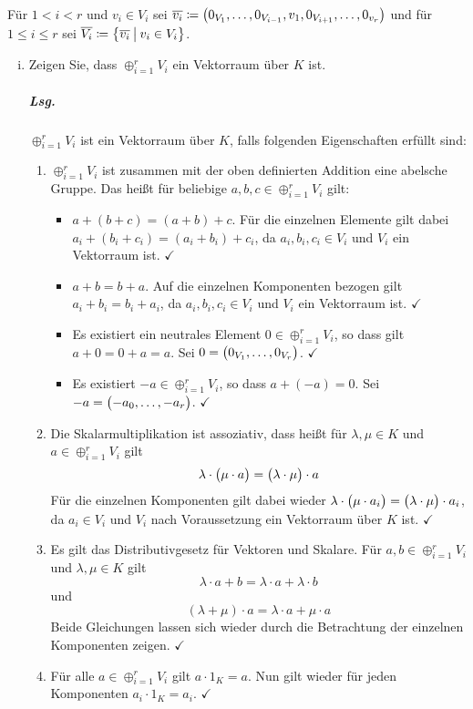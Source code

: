 \documentclass{scrreprt}
\begin{document}
\noindent
Für $1 < i < r$ und $v_i \in V_i$ sei $\overline{v_i} \coloneqq \qty\big(
  0_{V_1}, \ldots, 0_{V_{i - 1}}, v_1, 0_{V_{i + 1}}, \ldots, 0_{v_r}
)$ und für $1 \leq i \leq r$ sei $\overline{V_i} \coloneqq \qty\big{
  \overline{v_i} \:{\big |}\: v_i \in V_i
}$.
\newpage
\begin{enumerate}[(i)]
\item Zeigen Sie, dass $\oplus_{i = 1}^r V_i$ ein Vektorraum über $K$ ist.

  \subparagraph{Lsg.} $\oplus_{i = 1}^r V_i$ ist ein Vektorraum über $K$, falls
  folgenden Eigenschaften erfüllt sind:
  \begin{enumerate}[(1)]
  \item $\oplus_{i = 1}^r V_i$ ist zusammen mit der oben definierten Addition
    eine abelsche Gruppe.
    Das heißt für beliebige $a, b, c \in \oplus_{i = 1}^r V_i$ gilt:
    \begin{itemize}
    \item $a + (b + c) = (a + b) + c$.
      Für die einzelnen Elemente gilt dabei
      $a_i + (b_i + c_i) = (a_i + b_i) + c_i$, da $a_i, b_i, c_i \in V_i$
      und $V_i$ ein Vektorraum ist. $\checkmark$
    \item $a + b = b + a$.
      Auf die einzelnen Komponenten bezogen gilt $a_i + b_i = b_i + a_i$,
      da $a_i, b_i, c_i \in V_i$ und $V_i$ ein Vektorraum ist. $\checkmark$
    \item Es existiert ein neutrales Element $0 \in \oplus_{i = 1}^r V_i$,
      so dass gilt $a + 0 = 0 + a = a$.
      Sei $0 = \qty\big(0_{V_1}, \ldots, 0_{V_r})$.
      $\checkmark$
    \item Es existiert $-a \in \oplus_{i = 1}^r V_i$, so dass $a + (-a) = 0$.
      Sei $-a = \qty\big(-a_0, \ldots, -a_r)$.
      $\checkmark$
    \end{itemize}
  \item Die Skalarmultiplikation ist assoziativ, dass heißt für
    $\lambda, \mu \in K$ und $a \in \oplus_{i = 1}^r V_i$ gilt
    \[
      \lambda \cdot \qty\big(\mu \cdot a)
      = \qty\big(\lambda \cdot \mu) \cdot a
    \]
    Für die einzelnen Komponenten gilt dabei wieder
    $\lambda \cdot \qty\big(\mu \cdot a_i) =
    \qty\big(\lambda \cdot \mu) \cdot a_i$, da $a_i \in V_i$
    und $V_i$ nach Voraussetzung ein Vektorraum über $K$ ist.
    $\checkmark$
  \item Es gilt das Distributivgesetz für Vektoren und Skalare.
    Für $a, b \in \oplus_{i = 1}^r V_i$ und $\lambda, \mu \in K$ gilt
    \[
      \lambda \cdot a + b = \lambda \cdot a + \lambda \cdot b
    \]
    und
    \[
      (\lambda + \mu) \cdot a = \lambda \cdot a + \mu \cdot a
    \]
    Beide Gleichungen lassen sich wieder durch die Betrachtung der einzelnen
    Komponenten zeigen. $\checkmark$
  \item Für alle $a \in \oplus_{i = 1}^r V_i$ gilt $a \cdot 1_K = a$.
    Nun gilt wieder für jeden Komponenten $a_i \cdot 1_K = a_i$.
    $\checkmark$
  \end{enumerate}


\end{enumerate}
\end{document}
